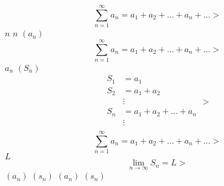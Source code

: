 \documentclass{article}
\begin{document}
$$
  \sum_{n=1}^{\infty}{a_n} = a_1 + a_2 + \dots + a_n + \dots
>$$
$n$
$n$
$(a_n)$
$$
  \sum_{n=1}^{\infty}{a_n} = a_1 + a_2 + \dots + a_n + \dots
>$$
$a_n$
$(S_n)$
$$
\begin{aligned}
  S_1 &= a_1\\
  S_2 &= a_1 + a_2\\
  &\vdots\\
  S_n &= a_1 + a_2 + \dots + a_n\\
  &\vdots\\
\end{aligned}
>$$
$$
  \sum_{n=1}^{\infty}{a_n} = a_1 + a_2 + \dots + a_n + \dots
>$$
$L$
$$
  \lim_{n \to \infty} S_n = L
>$$
$(a_n)$
$(s_n)$
$(a_n)$
$(s_n)$
\end{document}
